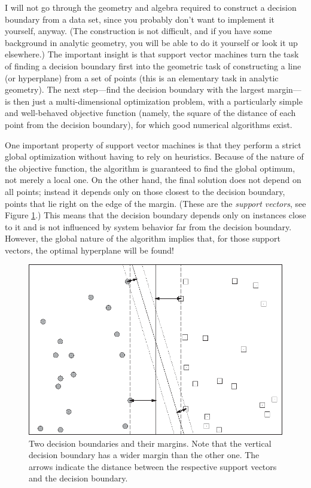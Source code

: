 I will not go through the geometry and algebra required to construct a
decision boundary from a data set, since you probably don't want to
implement it yourself, anyway. (The construction is not difficult, and
if you have some background in analytic geometry, you will be able to
do it yourself or look it up elsewhere.) The important insight is that
support vector machines turn the task of finding a decision boundary
first into the geometric task of constructing a line (or hyperplane)
from a set of points (this is an elementary task in analytic
geometry).  The next step---find the decision boundary with the
largest margin---is then just a multi-dimensional optimization
problem, with a particularly simple and well-behaved objective
function (namely, the square of the distance of each point from the
decision boundary), for which good numerical algorithms exist.

\leaflong{6pt}

One important property of support vector machines is that they perform
a strict global optimization without having to rely on heuristics.
Because of the nature of the objective function, the algorithm is
guaranteed to find the global optimum, not merely a local one. On the
other hand, the final solution does not depend on all points; instead
it depends only on those closest to the decision boundary, points that
lie right on the edge of the margin. (These are the \emph{support
  vectors}, see Figure \ref{fig:svm}.) This means\vadjust{\pagebreak} that the decision
boundary depends only on instances close to it and is not influenced
by system behavior far from the decision boundary. However, the global
nature of the algorithm implies that, for those support vectors, the
optimal hyperplane will be found!

\begin{figure}
\centerline{\includegraphics{img/svm}}
  \caption{Two decision boundaries and their margins. Note that the
    vertical decision boundary has a wider margin than the other one.
    The arrows indicate the distance between the respective support
    vectors and the decision boundary.}
  \label{fig:svm}\vspace*{-9pt}
\end{figure} 

